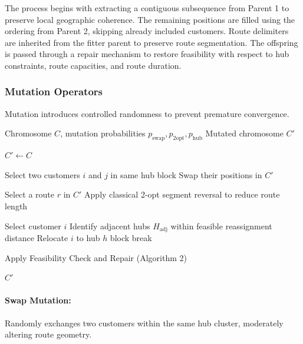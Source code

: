 \documentclass[conference]{IEEEtran}
\begin{document}
The process begins with extracting a contiguous subsequence from Parent 1 to preserve local geographic coherence. The remaining positions are filled using the ordering from Parent 2, skipping already included customers. Route delimiters are inherited from the fitter parent to preserve route segmentation. The offspring is passed through a repair mechanism to restore feasibility with respect to hub constraints, route capacities, and route duration.

\subsubsection{Mutation Operators}

Mutation introduces controlled randomness to prevent premature convergence.

\begin{algorithm}[htbp]
\caption{Mutation Operators}
\begin{algorithmic}[1]
\REQUIRE Chromosome $C$, mutation probabilities $p_{\text{swap}}, p_{\text{2opt}}, p_{\text{hub}}$
\ENSURE Mutated chromosome $C'$

\STATE $C' \leftarrow C$

    \STATE Select two customers $i$ and $j$ in same hub block
    \STATE Swap their positions in $C'$
\ENDIF

    \STATE Select a route $r$ in $C'$
    \STATE Apply classical 2-opt segment reversal to reduce route length
\ENDIF

    \STATE Select customer $i$
    \STATE Identify adjacent hubs $H_{\text{adj}}$ within feasible reassignment distance
            \STATE Relocate $i$ to hub $h$ block
            \STATE break
        \ENDIF
    \ENDFOR
\ENDIF

\STATE Apply Feasibility Check and Repair (Algorithm 2)

\RETURN $C'$
\end{algorithmic}
\end{algorithm}

\paragraph{Swap Mutation:}
Randomly exchanges two customers within the same hub cluster, moderately altering route geometry.
\end{document}
